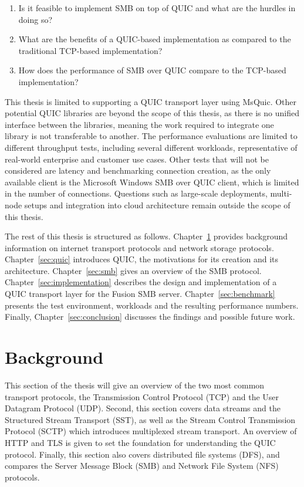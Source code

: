 \documentclass[english, 12pt, a4paper, elec, utf8, a-2b, online]{aaltothesis}
\begin{document}
\begin{enumerate}
  \item Is it feasible to implement SMB on top of QUIC and what are the hurdles in doing so?
  \item What are the benefits of a QUIC-based implementation as compared to the traditional TCP-based implementation?
  \item How does the performance of SMB over QUIC compare to the TCP-based implementation?
\end{enumerate}

This thesis is limited to supporting a QUIC transport layer using MsQuic. Other
potential QUIC libraries are beyond the scope of this thesis, as there is no
unified interface between the libraries, meaning the work required to integrate one library is
not transferable to another. The performance evaluations
are limited to different throughput tests, including several different workloads, representative of
real-world enterprise and customer use cases.
Other tests that will not be considered are latency and benchmarking connection creation,
as the only available client is the Microsoft Windows SMB over QUIC client, which is
limited in the number of connections. Questions such as large-scale deployments,
multi-node setups and integration into cloud architecture remain outside the scope
of this thesis.

The rest of this thesis is structured as follows. Chapter~\ref{sec:background} provides
background information on internet transport protocols and network storage protocols. Chapter~\ref{sec:quic} introduces
QUIC, the motivations for its creation and its architecture. Chapter~\ref{sec:smb} gives
an overview of the SMB protocol. Chapter~\ref{sec:implementation} describes the design
and implementation of a QUIC transport layer for the Fusion SMB server. Chapter~\ref{sec:benchmark}
presents the test environment, workloads and the resulting performance numbers. Finally, Chapter~\ref{sec:conclusion}
discusses the findings and possible future work.
\clearpage

\section{Background}
\label{sec:background}
This section of the thesis will give an overview of the two most common transport
protocols, the Transmission Control Protocol (TCP) and the User Datagram Protocol (UDP).
Second, this section covers data streams and the Structured Stream Transport (SST),
as well as the Stream Control Transmission Protocol (SCTP) which introduces multiplexed
stream transport. An overview of HTTP and TLS is given to set the foundation for
understanding the QUIC protocol. Finally, this section also covers distributed
file systems (DFS), and compares the Server Message Block (SMB) and Network File System (NFS) protocols.
\end{document}
